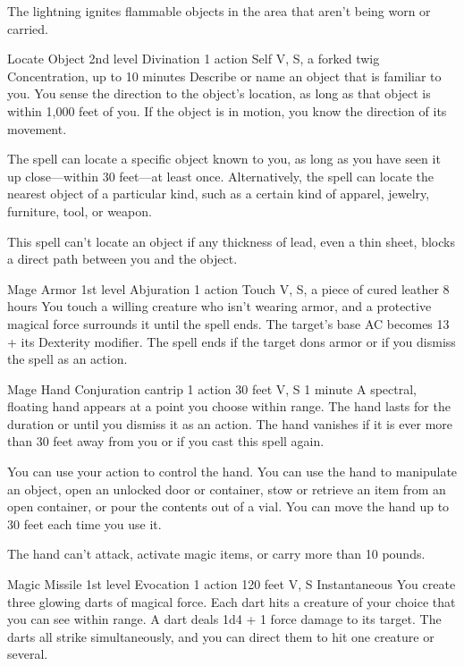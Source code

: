 \documentclass[10pt,a4paper,twoside,bg=print,twocolumn,openany,nodeprecatedcode]{dndbook}
\begin{document}
The lightning ignites flammable objects in the area that aren't being worn or carried.



\DndSpellHeader%
{Locate Object}
{2nd level Divination}
{1 action}
{Self}
{V, S, a forked twig}
{Concentration, up to 10 minutes}
Describe or name an object that is familiar to you. You sense the direction to the object's location, as long as that object is within 1,000 feet of you. If the object is in motion, you know the direction of its movement.

The spell can locate a specific object known to you, as long as you have seen it up close—within 30 feet—at least once. Alternatively, the spell can locate the nearest object of a particular kind, such as a certain kind of apparel, jewelry, furniture, tool, or weapon.

This spell can't locate an object if any thickness of lead, even a thin sheet, blocks a direct path between you and the object.



\DndSpellHeader%
{Mage Armor}
{1st level Abjuration}
{1 action}
{Touch}
{V, S, a piece of cured leather}
{8 hours}
You touch a willing creature who isn't wearing armor, and a protective magical force surrounds it until the spell ends. The target's base AC becomes 13 + its Dexterity modifier. The spell ends if the target dons armor or if you dismiss the spell as an action.



\DndSpellHeader%
{Mage Hand}
{Conjuration cantrip}
{1 action}
{30 feet}
{V, S}
{1 minute}
A spectral, floating hand appears at a point you choose within range. The hand lasts for the duration or until you dismiss it as an action. The hand vanishes if it is ever more than 30 feet away from you or if you cast this spell again.

You can use your action to control the hand. You can use the hand to manipulate an object, open an unlocked door or container, stow or retrieve an item from an open container, or pour the contents out of a vial. You can move the hand up to 30 feet each time you use it.

The hand can't attack, activate magic items, or carry more than 10 pounds.



\DndSpellHeader%
{Magic Missile}
{1st level Evocation}
{1 action}
{120 feet}
{V, S}
{Instantaneous}
You create three glowing darts of magical force. Each dart hits a creature of your choice that you can see within range. A dart deals 1d4 + 1 force damage to its target. The darts all strike simultaneously, and you can direct them to hit one creature or several.
\end{document}

